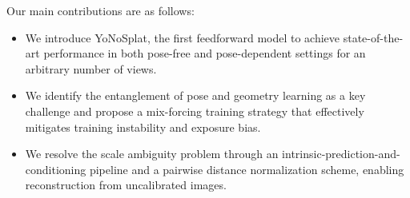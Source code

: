 Our main contributions are as follows:
\begin{itemize}[leftmargin=*, nosep]
    \item We introduce YoNoSplat, the first feedforward model to achieve state-of-the-art performance in both pose-free and pose-dependent settings for an arbitrary number of views.
    \item We identify the entanglement of pose and geometry learning as a key challenge and propose a mix-forcing training strategy that effectively mitigates training instability and exposure bias.
    \item We resolve the scale ambiguity problem through an intrinsic-prediction-and-conditioning pipeline and a pairwise distance normalization scheme, enabling reconstruction from uncalibrated images.
\end{itemize}






